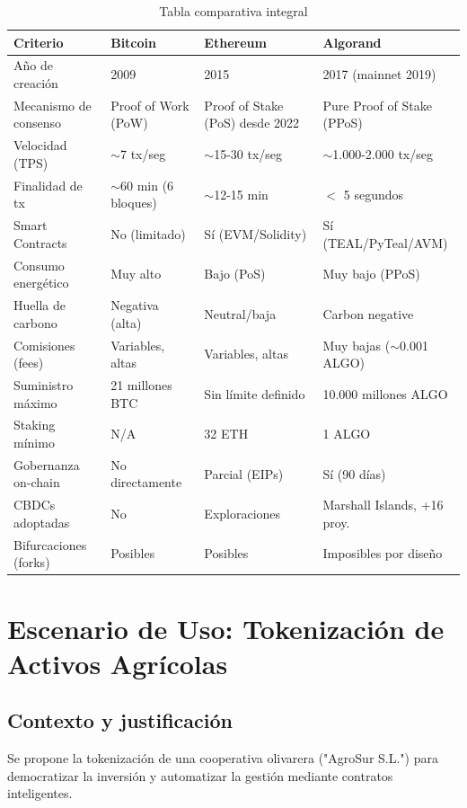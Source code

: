 \documentclass[12pt]{article}
\begin{document}
\begingroup
\centering
\begin{longtable}{|p{4cm}|p{3.5cm}|p{3.5cm}|p{3.5cm}|}
\caption{Tabla comparativa integral} \\
\hline
\textbf{Criterio} & \textbf{Bitcoin} & \textbf{Ethereum} & \textbf{Algorand} \\ \hline
\endhead
Año de creación & 2009 & 2015 & 2017 (mainnet 2019) \\ \hline
Mecanismo de consenso & Proof of Work (PoW) & Proof of Stake (PoS) desde 2022 & Pure Proof of Stake (PPoS) \\ \hline
Velocidad (TPS) & $\sim$7 tx/seg & $\sim$15-30 tx/seg & $\sim$1.000-2.000 tx/seg \\ \hline
Finalidad de tx & $\sim$60 min (6 bloques) & $\sim$12-15 min & $<$ 5 segundos \\ \hline
Smart Contracts & No (limitado) & Sí (EVM/Solidity) & Sí (TEAL/PyTeal/AVM) \\ \hline
Consumo energético & Muy alto & Bajo (PoS) & Muy bajo (PPoS) \\ \hline
Huella de carbono & Negativa (alta) & Neutral/baja & Carbon negative \\ \hline
Comisiones (fees) & Variables, altas & Variables, altas & Muy bajas ($\sim$0.001 ALGO) \\ \hline
Suministro máximo & 21 millones BTC & Sin límite definido & 10.000 millones ALGO \\ \hline
Staking mínimo & N/A & 32 ETH & 1 ALGO \\ \hline
Gobernanza on-chain & No directamente & Parcial (EIPs) & Sí (90 días) \\ \hline
CBDCs adoptadas & No & Exploraciones & Marshall Islands, +16 proy. \\ \hline
Bifurcaciones (forks) & Posibles & Posibles & Imposibles por diseño \\ \hline
\end{longtable}
\endgroup

\section{Escenario de Uso: Tokenización de Activos Agrícolas}

\subsection{Contexto y justificación}
Se propone la tokenización de una cooperativa olivarera ("AgroSur S.L.") para democratizar la inversión y automatizar la gestión mediante contratos inteligentes.
\end{document}
